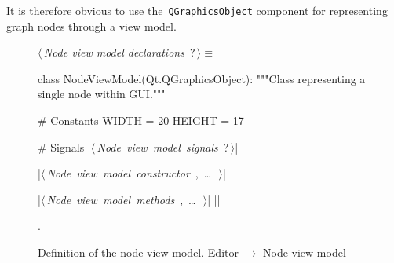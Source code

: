 \documentclass[%
    a4paper,    %
    justified,  %
    nobib,      %
    openany     %
]{tufte-book}
\begin{document}
It is therefore obvious to use the~\verb=QGraphicsObject= component
for representing graph nodes through a view model.

\begin{figure}
\begin{flushleft} \small
\begin{minipage}{\linewidth}\label{scrap68}\raggedright\small
{} $\langle\,${\itshape Node view model declarations}\nobreak\ {\footnotesize {?}}$\,\rangle\equiv$
\vspace{-1ex}
\begin{pythoncode}
class NodeViewModel(Qt.QGraphicsObject):
    """Class representing a single node within GUI."""

    # Constants
    WIDTH = 20
    HEIGHT = 17

    # Signals
    |\hbox{$\langle\,${\itshape Node view model signals}\nobreak\ {\footnotesize ?}$\,\rangle$}|

    |\hbox{$\langle\,${\itshape Node view model constructor}\nobreak\ {\footnotesize {}, \ldots\ }$\,\rangle$}|

    |\hbox{$\langle\,${\itshape Node view model methods}\nobreak\ {\footnotesize {}, \ldots\ }$\,\rangle$}|
|\NWsep|
\end{pythoncode}
\vspace{1.5ex}
\footnotesize
\begin{list}{}{\setlength{\itemsep}{-\parsep}\setlength{\itemindent}{-\leftmargin}}
\item {\NWtxtMacroNoRef}.

\item{}
\end{list}
\end{minipage}\vspace{4ex}
\end{flushleft}
\caption{Definition of the node view model.
  \newline{}\newline{}Editor $\rightarrow$ Node view model}
\label{editor:lst:node-view-model}
\end{figure}
\end{document}
